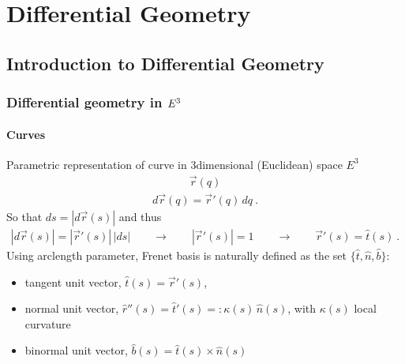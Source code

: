 \documentclass[letterpaper,10pt,english]{jupyterBook}
\begin{document}
\part{Differential Geometry}

\sphinxstepscope


\chapter{Introduction to Differential Geometry}
\label{\detokenize{ch/differential-geometry/intro:introduction-to-differential-geometry}}\label{\detokenize{ch/differential-geometry/intro:differential-geometry-intro}}\label{\detokenize{ch/differential-geometry/intro::doc}}

\section{Differential geometry in \protect\(E^3\protect\)}
\label{\detokenize{ch/differential-geometry/intro:differential-geometry-in-e-3}}

\subsection{Curves}
\label{\detokenize{ch/differential-geometry/intro:curves}}
\sphinxAtStartPar
Parametric representation of curve in 3\sphinxhyphen{}dimensional (Euclidean) space \(E^3\)
\begin{equation*}
\begin{split}\vec{r}(q)\end{split}
\end{equation*}
\sphinxAtStartPar
{}
\begin{equation*}
\begin{split}d \vec{r}(q) = \vec{r}'(q) \, d q \ .\end{split}
\end{equation*}
\sphinxAtStartPar
{} So that \(d s = |d \vec{r}(s)|\) and thus
\begin{equation*}
\begin{split}|d \vec{r}(s)| = |\vec{r}'(s)| \, |d s| \qquad \rightarrow \qquad |\vec{r}'(s)| = 1 \qquad \rightarrow \qquad \vec{r}'(s) = \hat{t}(s) \ .\end{split}
\end{equation*}
\sphinxAtStartPar
{} Using arc\sphinxhyphen{}length parameter, Frenet basis is naturally defined as the set \(\{ \hat{t}, \hat{n}, \hat{b} \}\):
\begin{itemize}
\item {} 
\sphinxAtStartPar
tangent unit vector, \(\hat{t}(s) = \vec{r}'(s)\),

\item {} 
\sphinxAtStartPar
normal unit vector, \(\hat{r}''(s) = \hat{t}'(s) =: \kappa(s) \, \hat{n}(s) \), with \(\kappa(s)\) local curvature

\item {} 
\sphinxAtStartPar
binormal unit vector, \(\hat{b}(s) = \hat{t}(s) \times \hat{n}(s)\)

\end{itemize}
\end{document}

